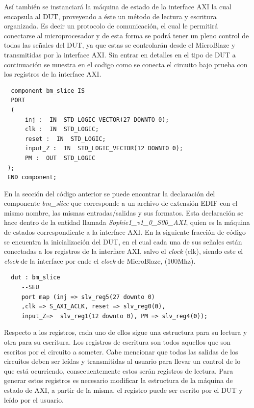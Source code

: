 \documentclass[a4paper,openright,12pt]{report}
\begin{document}
 Así también se instanciará la máquina de estado de la interface AXI la cual encapsula al DUT, proveyendo a éste un método de lectura y escritura organizada. Es decir un protocolo de comunicación, el cual le permitirá conectarse al microprocesador y de esta forma se podrá tener un pleno control de todas las señales del DUT, ya que estas se controlarán desde el MicroBlaze y transmitidas por la interface AXI.
    Sin entrar en detalles en el tipo de DUT a continuación se muestra en el codigo como se conecta el circuito bajo prueba con los registros de la interface AXI.
    
    \begin{lstlisting}  
  component bm_slice IS 
  PORT
  (
      inj :  IN  STD_LOGIC_VECTOR(27 DOWNTO 0);
      clk :  IN  STD_LOGIC;
      reset :  IN  STD_LOGIC;
      input_Z :  IN  STD_LOGIC_VECTOR(12 DOWNTO 0);
      PM :  OUT  STD_LOGIC
 );
 END component;

  \end{lstlisting}  
    En la sección del código anterior se puede encontrar la declaración del componente \textit{bm\_slice} que corresponde a un archivo de extensión EDIF con el mismo nombre, las mismas entradas/salidas y sus formatos. Esta declaración se hace dentro de la entidad llamada \textit{Sophie1\_v1\_0\_S00\_AXI}, quien es la máquina de estados correspondiente a la interface AXI.
    En la siguiente fracción de código se encuentra la inicialización del DUT, en el cual cada una de sus señales están conectadas a los registros de la interface AXI, salvo el \textit{clock} (clk), siendo este  el \textit{clock} de la interface por ende el \textit{clock} de MicroBlaze, (100Mhz).
    
  \begin{lstlisting}  
  dut : bm_slice
     --SEU   
     port map (inj => slv_reg5(27 downto 0)
     ,clk => S_AXI_ACLK, reset => slv_reg0(0),
     input_Z=>  slv_reg1(12 downto 0), PM => slv_reg4(0));
   \end{lstlisting} 
   
   
  
   
   Respecto a los registros, cada uno de ellos sigue una estructura para su lectura y otra para su escritura. Los registros de escritura son todos aquellos que son escritos por el circuito a someter.  Cabe mencionar que   todas las salidas de los circuitos deben ser leídas y transmitidas al usuario para llevar un control de lo que está ocurriendo, consecuentemente estos serán registros de lectura. Para generar estos registros es necesario modificar la estructura de la máquina de estado de AXI, a partir de la misma, el registro puede ser escrito por el DUT y leído por el usuario.
   
\end{document}
